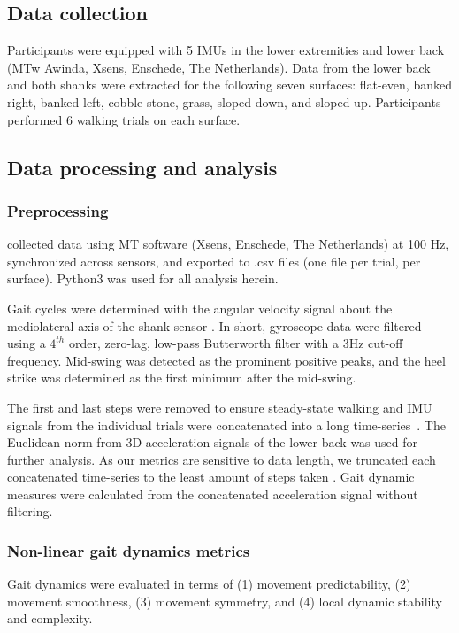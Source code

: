 \documentclass[authoryear,preprint,review,12pt]{elsarticle}
\begin{document}
\subsection{Data collection}
Participants were equipped with 5 IMUs in the lower extremities and lower back (MTw Awinda, Xsens, Enschede, The Netherlands). Data from the lower back and both shanks were extracted for the following seven surfaces: flat-even, banked right, banked left, cobble-stone, grass, sloped down, and sloped up. Participants performed 6 walking trials on each surface.

\subsection{Data processing and analysis}
\subsubsection{Preprocessing}
\citet{luo_database_2020} collected data using MT software (Xsens, Enschede, The Netherlands) at 100 Hz, synchronized across sensors, and exported to .csv files (one file per trial, per surface). Python3 was used for all analysis herein.

Gait cycles were determined with the angular velocity signal about the mediolateral axis of the shank sensor \citep{mcgrath2012gyroscope}. In short, gyroscope data were filtered using a $4^{th}$ order, zero-lag, low-pass Butterworth filter with a 3Hz cut-off frequency. Mid-swing was detected as the prominent positive peaks, and the heel strike was determined as the first minimum after the mid-swing. 

The first and last steps were removed to ensure steady-state walking \citep{breniere_when_1986} and IMU signals from the individual trials were concatenated into a long time-series~\citep{preatoni_motor_2010, emmerzaal_movement_2022}. The Euclidean norm from 3D acceleration signals of the lower back was used for further analysis. As our metrics are sensitive to data length, we truncated each concatenated time-series to the least amount of steps taken \citep{yentes2013appropriate}. Gait dynamic measures were calculated from the concatenated acceleration signal without filtering.

\subsubsection{Non-linear gait dynamics metrics}
Gait dynamics were evaluated in terms of (1) movement predictability, (2) movement smoothness, (3) movement symmetry, and (4) local dynamic stability and complexity.
\end{document}
